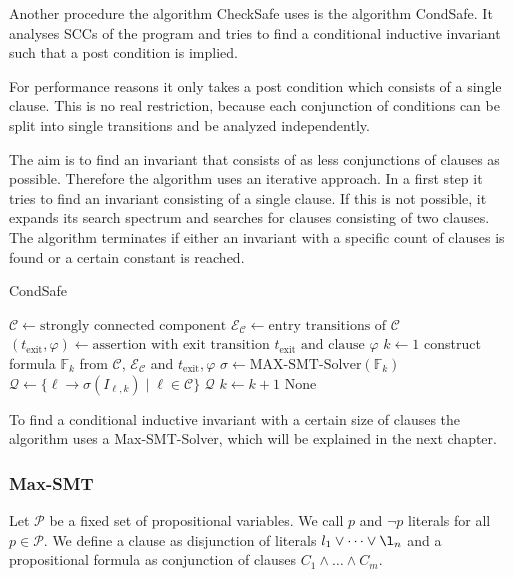 Another procedure the algorithm CheckSafe uses is the algorithm CondSafe.
It analyses SCCs of the program and tries to find a conditional inductive invariant such that a post condition is implied.

For performance reasons it only takes a post condition which consists of a single clause.
This is no real restriction, because each conjunction of conditions can be split into single transitions and be analyzed independently.

The aim is to find an invariant that consists of as less conjunctions of clauses as possible.
Therefore the algorithm uses an iterative approach.
In a first step it tries to find an invariant consisting of a single clause.
If this is not possible, it expands its search spectrum and searches for clauses consisting of two clauses.
The algorithm terminates if either an invariant with a specific count of clauses is found or a certain constant is reached.

\begin{algorithm}
\caption{CondSafe}\label{condsafe}
\begin{algorithmic}[1]
\State $\mathcal{C} \gets \text{strongly connected component}$
\State $\mathcal{E}_\mathcal{C} \gets \text{entry transitions of } \mathcal{C}$
\State $(t_\text{exit}, \varphi) \gets \text{assertion with exit transition } t_\text{exit} \text{ and clause } \varphi$
\State $k \gets 1$
\Repeat
  \State construct formula $\mathbb{F}_k$ from $\mathcal{C}$, $\mathcal{E}_\mathcal{C}$ and $t_\text{exit}, \varphi$
  \State $\sigma \gets \text{MAX-SMT-Solver}(\mathbb{F}_k)$
    \State $\mathcal{Q} \gets \lbrace \ell \rightarrow \sigma(I_{\ell, k}) \mid \ell \in \mathcal{C} \rbrace$
    \Return $\mathcal{Q}$
  \EndIf
  \State $k \gets k + 1$
\Return None
\end{algorithmic}
\end{algorithm}

To find a conditional inductive invariant with a certain size of clauses the algorithm uses a Max-SMT-Solver, which will be explained in the next chapter.

\subsubsection{Max-SMT}

Let $\mathcal{P}$ be a fixed set of propositional variables.
We call $p$ and $\neg p$ literals for all $p \in \mathcal{P}$.
We define a clause as disjunction of literals $l_1 \vee \dots \vee \l_n$ and a propositional formula as conjunction of clauses $C_1 \wedge \dots \wedge C_m$.

